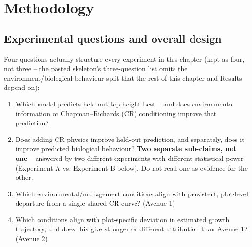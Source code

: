 \documentclass[11pt,a4paper]{report}
\begin{document}

\chapter{Methodology}

\section{Experimental questions and overall design}

Four questions actually structure every experiment in this chapter (kept as four, not three --
the pasted skeleton's three-question list omits the environment/biological-behaviour split that
the rest of this chapter and Results depend on):

\begin{enumerate}
  \setlength{\itemsep}{0pt}
  \item Which model predicts held-out top height best -- and does environmental information or
  Chapman--Richards (CR) conditioning improve that prediction?
  \item Does adding CR physics improve held-out prediction, and separately, does it improve
  predicted biological behaviour? \textbf{Two separate sub-claims, not one} -- answered by two
  different experiments with different statistical power (Experiment A vs. Experiment B below).
  Do not read one as evidence for the other.
  \item Which environmental/management conditions align with persistent, plot-level departure
  from a single shared CR curve? (Avenue 1)
  \item Which conditions align with plot-specific deviation in estimated growth trajectory, and
  does this give stronger or different attribution than Avenue 1? (Avenue 2)
\end{enumerate}
\end{document}
